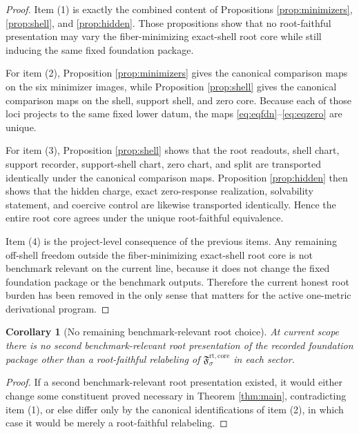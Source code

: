 \documentclass[11pt]{article}
\newcommand{\RootCore}[1]{\mathfrak F_{#1}^{\mathrm{rt,core}}}
\newtheorem{corollary}{Corollary}
\begin{document}
\begin{proof}
Item (1) is exactly the combined content of Propositions \ref{prop:minimizers}, \ref{prop:shell}, and \ref{prop:hidden}. Those propositions show that no root-faithful presentation may vary the fiber-minimizing exact-shell root core while still inducing the same fixed foundation package.

For item (2), Proposition \ref{prop:minimizers} gives the canonical comparison maps on the six minimizer images, while Proposition \ref{prop:shell} gives the canonical comparison maps on the shell, support shell, and zero core. Because each of those loci projects to the same fixed lower datum, the maps \eqref{eq:eqfdn}--\eqref{eq:eqzero} are unique.

For item (3), Proposition \ref{prop:shell} shows that the root readouts, shell chart, support recorder, support-shell chart, zero chart, and split are transported identically under the canonical comparison maps. Proposition \ref{prop:hidden} then shows that the hidden charge, exact zero-response realization, solvability statement, and coercive control are likewise transported identically. Hence the entire root core agrees under the unique root-faithful equivalence.

Item (4) is the project-level consequence of the previous items. Any remaining off-shell freedom outside the fiber-minimizing exact-shell root core is not benchmark relevant on the current line, because it does not change the fixed foundation package or the benchmark outputs. Therefore the current honest root burden has been removed in the only sense that matters for the active one-metric derivational program.
\end{proof}

\begin{corollary}[No remaining benchmark-relevant root choice]
\label{cor:nofreedom}
At current scope there is no second benchmark-relevant root presentation of the recorded foundation package other than a root-faithful relabeling of \(\RootCore{\sigma}\) in each sector.
\end{corollary}

\begin{proof}
If a second benchmark-relevant root presentation existed, it would either change some constituent proved necessary in Theorem \ref{thm:main}, contradicting item (1), or else differ only by the canonical identifications of item (2), in which case it would be merely a root-faithful relabeling.
\end{proof}
\end{document}
